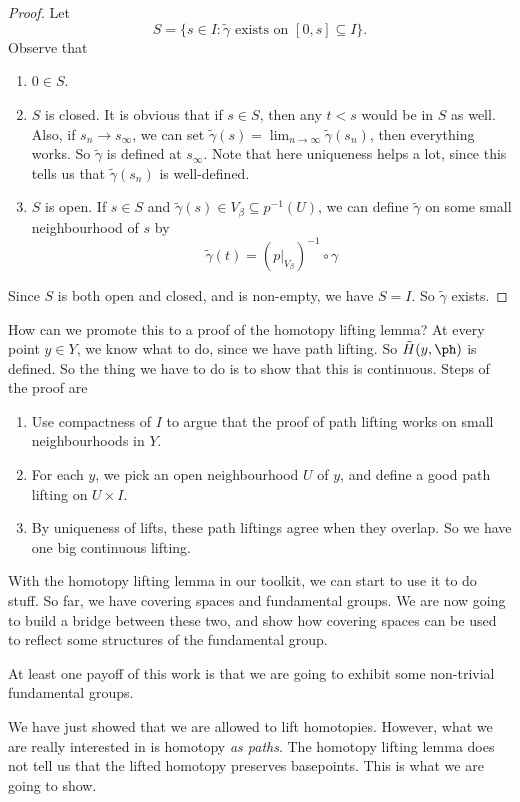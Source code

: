 \documentclass[a4paper]{article}
\begin{document}
\begin{proof}
  Let
  \[
    S = \{s \in I: \tilde{\gamma}\text{ exists on }[0, s] \subseteq I\}.
  \]
  Observe that
  \begin{enumerate}
    \item $0\in S$.
    \item $S$ is closed. It is obvious that if $s \in S$, then any $t < s$ would be in $S$ as well. Also, if $s_n \to s_{\infty}$, we can set $\tilde{\gamma}(s) = \lim_{n \to \infty}\tilde{\gamma}(s_n)$, then everything works. So $\tilde{\gamma}$ is defined at $s_{\infty}$. Note that here uniqueness helps a lot, since this tells us that $\tilde{\gamma}(s_n)$ is well-defined.

    \item $S$ is open. If $s\in S$ and $\tilde{\gamma}(s) \in V_\beta \subseteq p^{-1}(U)$, we can define $\tilde{\gamma}$ on some small neighbourhood of $s$ by
      \[
        \tilde{\gamma}(t) = (p|_{V_\beta})^{-1}\circ \gamma
      \]
  \end{enumerate}
  Since $S$ is both open and closed, and is non-empty, we have $S = I$. So $\tilde{\gamma}$ exists.
\end{proof}
How can we promote this to a proof of the homotopy lifting lemma? At every point $y\in Y$, we know what to do, since we have path lifting. So $\tilde{H}(y, \ph)$ is defined. So the thing we have to do is to show that this is continuous. Steps of the proof are
\begin{enumerate}
  \item Use compactness of $I$ to argue that the proof of path lifting works on small neighbourhoods in $Y$.
  \item For each $y$, we pick an open neighbourhood $U$ of $y$, and define a good path lifting on $U\times I$.
  \item By uniqueness of lifts, these path liftings agree when they overlap. So we have one big continuous lifting.
\end{enumerate}

With the homotopy lifting lemma in our toolkit, we can start to use it to do stuff. So far, we have covering spaces and fundamental groups. We are now going to build a bridge between these two, and show how covering spaces can be used to reflect some structures of the fundamental group.

At least one payoff of this work is that we are going to exhibit some non-trivial fundamental groups.

We have just showed that we are allowed to lift homotopies. However, what we are really interested in is homotopy \emph{as paths}. The homotopy lifting lemma does not tell us that the lifted homotopy preserves basepoints. This is what we are going to show.
\end{document}
